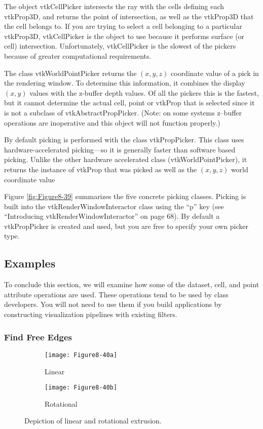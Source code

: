 The object vtkCellPicker intersects the ray with the cells defining each vtkProp3D, and returns the point of intersection, as well as the vtkProp3D that the cell belongs to. If you are trying to select a cell belonging to a particular vtkProp3D, vtkCellPicker is the object to use because it performs surface (or cell) intersection. Unfortunately, vtkCellPicker is the slowest of the pickers because of greater computational requirements.

The class vtkWorldPointPicker returns the $(x,y,z)$ coordinate value of a pick in the rendering window. To determine this information, it combines the display $(x,y)$ values with the z-buffer depth values. Of all the pickers this is the fastest, but it cannot determine the actual cell, point or vtkProp that is selected since it is not a subclass of vtkAbstractPropPicker. (Note: on some systems z--buffer operations are inoperative and this object will not function properly.)

By default picking is performed with the class vtkPropPicker. This class uses hardware-accelerated picking—so it is generally faster than software based picking. Unlike the other hardware accelerated class (vtkWorldPointPicker), it returns the instance of vtkProp that was picked as well as the $(x,y,z)$ world coordinate value

Figure \ref{fig:Figure8-39} summarizes the five concrete picking classes. Picking is built into the vtkRenderWindowInteractor class using the ``p'' key (see “Introducing vtkRenderWindowInteractor” on page 68). By default a vtkPropPicker is created and used, but you are free to specify your own picker type.

\subsection{Examples}

To conclude this section, we will examine how some of the dataset, cell, and point attribute operations are used. These operations tend to be used by class developers. You will not need to use them if you build applications by constructing visualization pipelines with existing filters.

\subsubsection{Find Free Edges}

\begin{figure}[!htb]
    \centering
    \begin{subfigure}{0.48\linewidth}
        \centering
        \texttt{[image: Figure8-40a]}
        \caption{Linear}\label{fig:Figure8-40a}
    \end{subfigure}
    \hfill
    \begin{subfigure}{0.48\linewidth}
        \centering
        \texttt{[image: Figure8-40b]}
        \caption{Rotational}\label{fig:Figure8-40b}
    \end{subfigure}%
    \caption{Depiction of linear and rotational extrusion.}
    \label{fig:Figure8-40}
\end{figure}

